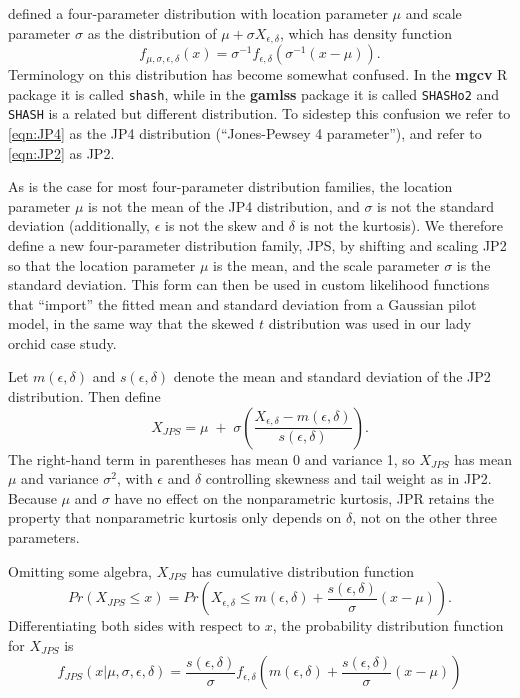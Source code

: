 \documentclass[12pt]{article}
\newcommand{\be}{\begin{equation}}
\newcommand{\ee}{\end{equation}}
\begin{document}
\begin{spacing}{1.35}
	\citet{jones-pewsey-2009} defined a four-parameter distribution with location 
	parameter $\mu$ and scale parameter $\sigma$ as the distribution of $\mu + \sigma X_{\epsilon, \delta}$, 
	which has density function 
	\be
	f_{\mu, \sigma,  \epsilon,\delta}(x)  = \sigma^{-1}f_{ \epsilon,\delta}( \sigma^{-1}(x - \mu)). 
	\label{eqn:JP4} 
	\ee
	Terminology on this distribution has become somewhat confused. In the \textbf{mgcv} R package 
	it is called \texttt{shash}, while in the \textbf{gamlss} package it is called \texttt{SHASHo2} 
	and \texttt{SHASH} is a related but different distribution. To sidestep 
	this confusion we refer to \eqref{eqn:JP4} as the JP4 distribution (``Jones-Pewsey 4 parameter''), 
	and refer to \eqref{eqn:JP2} as JP2. 
	
	As is the case for most four-parameter distribution families, 
	the location parameter $\mu$ is not the mean of the JP4 distribution, 
	and $\sigma$ is not the standard deviation (additionally, $\epsilon$ is not the skew and $\delta$ is not the kurtosis). 
	We therefore define a new four-parameter distribution family, JPS, by shifting and scaling JP2
	so that the location parameter $\mu$ is the mean, and the scale parameter $\sigma$ is the standard deviation. 
	This form can then be used in custom likelihood functions that ``import'' the fitted mean 
	and standard deviation from a Gaussian pilot model, in the same way that the skewed $t$ distribution 
	was used in our lady orchid case study. 
	
	Let $m(\epsilon,\delta)$ and $s(\epsilon, \delta)$ denote the mean and standard deviation of the 
	JP2 distribution. Then define 
	\be  
	X_{JPS} = \mu \; + \; \sigma \left(\frac{X_{\epsilon,\delta} - m(\epsilon,\delta)}{s(\epsilon,\delta)}\right).
	\ee
	The right-hand term in parentheses has mean 0 and variance 1, so 
	$X_{JPS}$ has mean $\mu$ and variance $\sigma^2$, with $\epsilon$ and $\delta$ controlling skewness
	and tail weight as in JP2. Because $\mu$ and $\sigma$ have no effect on the nonparametric kurtosis, 
	JPR retains the property that nonparametric kurtosis only depends on $\delta$, not on the other three parameters. 
	
	Omitting some algebra, $X_{JPS}$ has cumulative distribution function 
	\be
	Pr(X_{JPS} \le x)  = Pr\left(X_{\epsilon,\delta} \le  m(\epsilon,\delta) + \frac{s(\epsilon,\delta)}{\sigma}(x - \mu)\right).
	\ee
	Differentiating both sides with respect to $x$, the probability distribution function for $X_{JPS}$ is 
	\be
	f_{JPS}(x \vert \mu, \sigma, \epsilon, \delta) =  \frac{s(\epsilon,\delta)}{\sigma} 
	f_{ \epsilon,\delta}\left(m(\epsilon,\delta) + \frac{s(\epsilon,\delta)}{\sigma}(x - \mu) \right) 
	\ee
	

\end{spacing}
\end{document}
